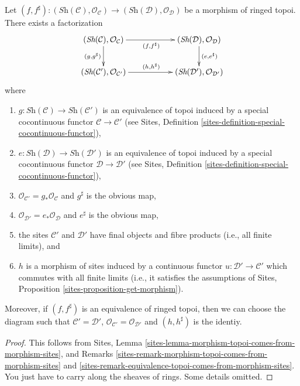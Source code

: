 \begin{lemma}
\label{lemma-morphism-ringed-topoi-comes-from-morphism-ringed-sites}
Let $(f, f^\sharp) :
(\textit{Sh}(\mathcal{C}), \mathcal{O}_{\mathcal{C}})
\to (\textit{Sh}(\mathcal{D}), \mathcal{O}_{\mathcal{D}})$
be a morphism of ringed topoi. There exists a factorization
$$
\xymatrix{
(\textit{Sh}(\mathcal{C}), \mathcal{O}_{\mathcal{C}})
\ar[rr]_{(f, f^\sharp)}
\ar[d]_{(g, g^\sharp)}
& &
(\textit{Sh}(\mathcal{D}), \mathcal{O}_{\mathcal{D}}) \ar[d]^{(e, e^\sharp)}
\\
(\textit{Sh}(\mathcal{C}'), \mathcal{O}_{\mathcal{C}'})
\ar[rr]^{(h, h^\sharp)} & &
(\textit{Sh}(\mathcal{D}'), \mathcal{O}_{\mathcal{D}'})
}
$$
where
\begin{enumerate}
\item $g : \textit{Sh}(\mathcal{C}) \to \textit{Sh}(\mathcal{C}')$
is an equivalence of topoi induced by a special cocontinuous functor
$\mathcal{C} \to \mathcal{C}'$ (see
Sites, Definition \ref{sites-definition-special-cocontinuous-functor}),
\item $e : \textit{Sh}(\mathcal{D}) \to \textit{Sh}(\mathcal{D}')$
is an equivalence of topoi induced by a special cocontinuous functor
$\mathcal{D} \to \mathcal{D}'$ (see
Sites, Definition \ref{sites-definition-special-cocontinuous-functor}),
\item $\mathcal{O}_{\mathcal{C}'} = g_*\mathcal{O}_{\mathcal{C}}$
and $g^\sharp$ is the obvious map,
\item $\mathcal{O}_{\mathcal{D}'} = e_*\mathcal{O}_{\mathcal{D}}$
and $e^\sharp$ is the obvious map,
\item the sites $\mathcal{C}'$ and $\mathcal{D}'$ have final objects
and fibre products (i.e., all finite limits), and
\item $h$ is a morphism of sites induced by a continuous functor
$u : \mathcal{D}' \to \mathcal{C}'$ which commutes with all finite limits
(i.e., it satisfies the assumptions of
Sites, Proposition \ref{sites-proposition-get-morphism}).
\end{enumerate}
Moreover, if $(f, f^\sharp)$ is an equivalence of ringed topoi,
then we can choose the diagram such that
$\mathcal{C}' = \mathcal{D}'$, 
$\mathcal{O}_{\mathcal{C}'} = \mathcal{O}_{\mathcal{D}'}$
and $(h, h^\sharp)$ is the identiy.
\end{lemma}

\begin{proof}
This follows from
Sites, Lemma \ref{sites-lemma-morphism-topoi-comes-from-morphism-sites},
and Remarks
\ref{sites-remark-morphism-topoi-comes-from-morphism-sites}
and
\ref{sites-remark-equivalence-topoi-comes-from-morphism-sites}.
You just have to carry along the sheaves of rings. Some details omitted.
\end{proof}









